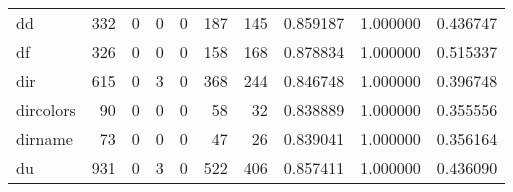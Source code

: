 \begin{longtable}{lrrrrrrrrr}
dd        &                                   332 &                                                  0 &                                                  0 &                                                  0 &                                                187 &                                                145 &                                           0.859187 &                               1.000000 &                             0.436747 \\
df        &                                   326 &                                                  0 &                                                  0 &                                                  0 &                                                158 &                                                168 &                                           0.878834 &                               1.000000 &                             0.515337 \\
dir       &                                   615 &                                                  0 &                                                  3 &                                                  0 &                                                368 &                                                244 &                                           0.846748 &                               1.000000 &                             0.396748 \\
dircolors &                                    90 &                                                  0 &                                                  0 &                                                  0 &                                                 58 &                                                 32 &                                           0.838889 &                               1.000000 &                             0.355556 \\
dirname   &                                    73 &                                                  0 &                                                  0 &                                                  0 &                                                 47 &                                                 26 &                                           0.839041 &                               1.000000 &                             0.356164 \\
du        &                                   931 &                                                  0 &                                                  3 &                                                  0 &                                                522 &                                                406 &                                           0.857411 &                               1.000000 &                             0.436090 \\

\end{longtable}
